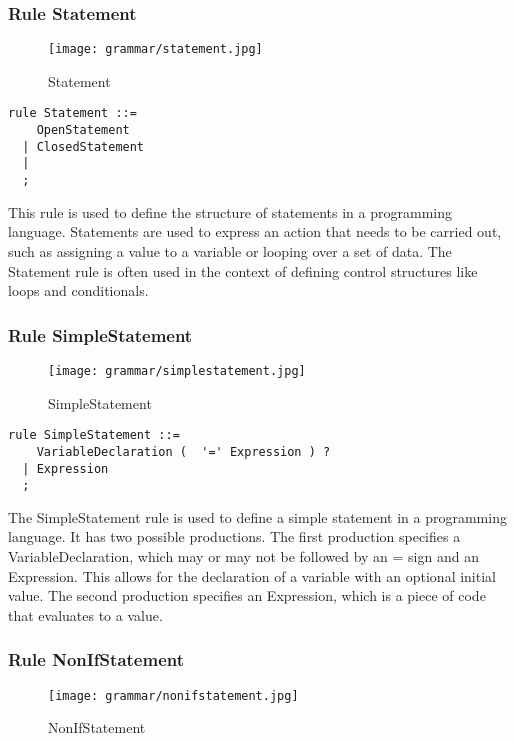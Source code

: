 \subsubsection*{Rule Statement}

\begin{figure}
\centering
\texttt{[image: grammar/statement.jpg]}
\caption{Statement}
\end{figure}

\begin{lstlisting}
rule Statement ::=
    OpenStatement 
  | ClosedStatement 
  | 
  ;
\end{lstlisting}

This rule is used to define the structure of statements in a programming language. Statements are used to express an action that needs to be carried out, such as assigning a value to a variable or looping over a set of data. The Statement rule is often used in the context of defining control structures like loops and conditionals.

\subsubsection*{Rule SimpleStatement}

\begin{figure}
  \centering
  \texttt{[image: grammar/simplestatement.jpg]}
  \caption{SimpleStatement}
  \end{figure}

\begin{lstlisting}
rule SimpleStatement ::=
    VariableDeclaration (  '=' Expression ) ?  
  | Expression 
  ;
\end{lstlisting}

The SimpleStatement rule is used to define a simple statement in a programming language. It has two possible productions. The first production specifies a VariableDeclaration, which may or may not be followed by an = sign and an Expression. This allows for the declaration of a variable with an optional initial value. The second production specifies an Expression, which is a piece of code that evaluates to a value.

\subsubsection*{Rule NonIfStatement}

\begin{figure}
  \centering
  \texttt{[image: grammar/nonifstatement.jpg]}
  \caption{NonIfStatement}
  \end{figure}

